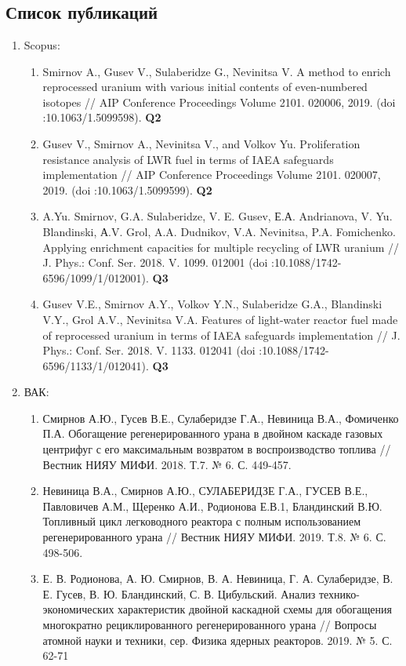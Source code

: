 \chapter{}

\section{Список публикаций}
\begin{enumerate}
	\item Scopus:
    \begin{enumerate}
        \item Smirnov A., Gusev V., Sulaberidze G., Nevinitsa V. A method to enrich reprocessed uranium with various initial contents of even-numbered isotopes // AIP Conference Proceedings Volume 2101. 020006, 2019. (doi :10.1063/1.5099598). \textbf{Q2}
        \item Gusev V., Smirnov A., Nevinitsa V., and Volkov Yu. Proliferation resistance analysis of LWR fuel in terms of IAEA safeguards implementation // AIP Conference Proceedings Volume 2101. 020007, 2019. (doi :10.1063/1.5099599). \textbf{Q2}
        \item A.Yu. Smirnov, G.A. Sulaberidze, V. E. Gusev, Е.А. Andrianova, V. Yu. Blandinski, А.V. Grol, A.A. Dudnikov, V.A. Nevinitsa, P.A. Fomichenko. Applying enrichment capacities for multiple recycling of LWR uranium //  J. Phys.: Conf. Ser. 2018. V. 1099. 012001 (doi :10.1088/1742-6596/1099/1/012001). \textbf{Q3}
        \item Gusev V.E., Smirnov A.Y., Volkov Y.N., Sulaberidze G.A., Blandinski V.Y., Grol A.V., Nevinitsa V.A. Features of light-water reactor fuel made of reprocessed uranium in terms of IAEA safeguards implementation // J. Phys.: Conf. Ser. 2018. V. 1133. 012041  (doi :10.1088/1742-6596/1133/1/012041). \textbf{Q3}
    \end{enumerate}
    \item ВАК:
    \begin{enumerate}
        \item Смирнов А.Ю., Гусев В.Е., Сулаберидзе Г.А., Невиница В.А., Фомиченко П.А. Обогащение регенерированного урана в двойном каскаде газовых центрифуг с его максимальным возвратом в воспроизводство топлива // Вестник НИЯУ МИФИ. 2018. Т.7. № 6. С. 449-457.
        \item 	Невиница В.А., Смирнов А.Ю., СУЛАБЕРИДЗЕ Г.А., ГУСЕВ В.Е., Павловичев А.М., Щеренко А.И., Родионова Е.В.1, Бландинский В.Ю. Топливный цикл легководного реактора с полным использованием регенерированного урана // Вестник НИЯУ МИФИ. 2019. Т.8. № 6. С. 498-506.
        \item Е. В. Родионова, А. Ю. Смирнов, В. А. Невиница, Г. А. Сулаберидзе, В. Е. Гусев, В. Ю. Бландинский, С. В. Цибульский. Анализ технико-экономических характеристик двойной каскадной схемы для обогащения многократно рециклированного регенерированного урана // Вопросы атомной науки и техники, сер. Физика ядерных реакторов. 2019. № 5. С. 62-71
        \end{enumerate}
\end{enumerate}

